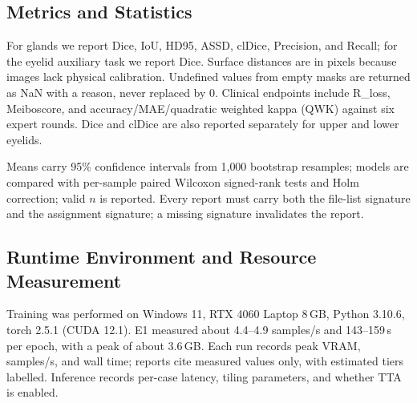 \subsection{Metrics and Statistics}

For glands we report Dice, IoU, HD95, ASSD, clDice, Precision, and Recall; for the eyelid auxiliary task we report Dice. Surface distances are in pixels because images lack physical calibration. Undefined values from empty masks are returned as NaN with a reason, never replaced by 0. Clinical endpoints include R\_loss, Meiboscore, and accuracy/MAE/quadratic weighted kappa (QWK) against six expert rounds. Dice and clDice are also reported separately for upper and lower eyelids.

Means carry 95\% confidence intervals from 1{,}000 bootstrap resamples; models are compared with per-sample paired Wilcoxon signed-rank tests and Holm correction; valid $n$ is reported. Every report must carry both the file-list signature and the assignment signature; a missing signature invalidates the report.

\subsection{Runtime Environment and Resource Measurement}

Training was performed on Windows 11, RTX 4060 Laptop 8\,GB, Python 3.10.6, torch 2.5.1 (CUDA 12.1). E1 measured about 4.4--4.9 samples/s and 143--159\,s per epoch, with a peak of about 3.6\,GB. Each run records peak VRAM, samples/s, and wall time; reports cite measured values only, with estimated tiers labelled. Inference records per-case latency, tiling parameters, and whether TTA is enabled.
